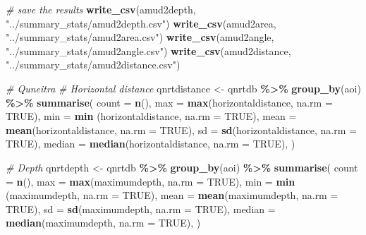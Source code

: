 \documentclass[
]{article}
\newenvironment{Shaded}{\begin{snugshade}}{\end{snugshade}}
\newcommand{\AttributeTok}[1]{\textcolor[rgb]{0.13,0.29,0.53}{#1}}
\newcommand{\CommentTok}[1]{\textcolor[rgb]{0.56,0.35,0.01}{\textit{#1}}}
\newcommand{\ConstantTok}[1]{\textcolor[rgb]{0.56,0.35,0.01}{#1}}
\newcommand{\FunctionTok}[1]{\textcolor[rgb]{0.13,0.29,0.53}{\textbf{#1}}}
\newcommand{\NormalTok}[1]{#1}
\newcommand{\OtherTok}[1]{\textcolor[rgb]{0.56,0.35,0.01}{#1}}
\newcommand{\SpecialCharTok}[1]{\textcolor[rgb]{0.81,0.36,0.00}{\textbf{#1}}}
\newcommand{\StringTok}[1]{\textcolor[rgb]{0.31,0.60,0.02}{#1}}
\begin{document}
\begin{Shaded}
\begin{Highlighting}[]
\CommentTok{\# save the results }
\FunctionTok{write\_csv}\NormalTok{(amud2depth, }\StringTok{"../summary\_stats/amud2depth.csv"}\NormalTok{)}
\FunctionTok{write\_csv}\NormalTok{(amud2area, }\StringTok{"../summary\_stats/amud2area.csv"}\NormalTok{)}
\FunctionTok{write\_csv}\NormalTok{(amud2angle, }\StringTok{"../summary\_stats/amud2angle.csv"}\NormalTok{)}
\FunctionTok{write\_csv}\NormalTok{(amud2distance, }\StringTok{"../summary\_stats/amud2distance.csv"}\NormalTok{)}

\CommentTok{\# Quneitra}
\CommentTok{\# Horizontal distance}
\NormalTok{qnrtdistance }\OtherTok{\textless{}{-}}\NormalTok{ qnrtdb }\SpecialCharTok{\%\textgreater{}\%} \FunctionTok{group\_by}\NormalTok{(aoi) }\SpecialCharTok{\%\textgreater{}\%}
      \FunctionTok{summarise}\NormalTok{(}
      \AttributeTok{count =} \FunctionTok{n}\NormalTok{(),}
      \AttributeTok{max =} \FunctionTok{max}\NormalTok{(horizontaldistance, }\AttributeTok{na.rm =} \ConstantTok{TRUE}\NormalTok{),}
      \AttributeTok{min =} \FunctionTok{min}\NormalTok{ (horizontaldistance, }\AttributeTok{na.rm =} \ConstantTok{TRUE}\NormalTok{),}
      \AttributeTok{mean =} \FunctionTok{mean}\NormalTok{(horizontaldistance, }\AttributeTok{na.rm =} \ConstantTok{TRUE}\NormalTok{),}
      \AttributeTok{sd =} \FunctionTok{sd}\NormalTok{(horizontaldistance, }\AttributeTok{na.rm =} \ConstantTok{TRUE}\NormalTok{),}
      \AttributeTok{median =} \FunctionTok{median}\NormalTok{(horizontaldistance, }\AttributeTok{na.rm =} \ConstantTok{TRUE}\NormalTok{),}
\NormalTok{  ) }

\CommentTok{\# Depth}
\NormalTok{qnrtdepth }\OtherTok{\textless{}{-}}\NormalTok{ qnrtdb }\SpecialCharTok{\%\textgreater{}\%} \FunctionTok{group\_by}\NormalTok{(aoi) }\SpecialCharTok{\%\textgreater{}\%}
      \FunctionTok{summarise}\NormalTok{(}
      \AttributeTok{count =} \FunctionTok{n}\NormalTok{(),}
      \AttributeTok{max =} \FunctionTok{max}\NormalTok{(maximumdepth, }\AttributeTok{na.rm =} \ConstantTok{TRUE}\NormalTok{),}
      \AttributeTok{min =} \FunctionTok{min}\NormalTok{ (maximumdepth, }\AttributeTok{na.rm =} \ConstantTok{TRUE}\NormalTok{),}
      \AttributeTok{mean =} \FunctionTok{mean}\NormalTok{(maximumdepth, }\AttributeTok{na.rm =} \ConstantTok{TRUE}\NormalTok{),}
      \AttributeTok{sd =} \FunctionTok{sd}\NormalTok{(maximumdepth, }\AttributeTok{na.rm =} \ConstantTok{TRUE}\NormalTok{),}
      \AttributeTok{median =} \FunctionTok{median}\NormalTok{(maximumdepth, }\AttributeTok{na.rm =} \ConstantTok{TRUE}\NormalTok{),}
\NormalTok{  ) }


\end{Highlighting}
\end{Shaded}
\end{document}
